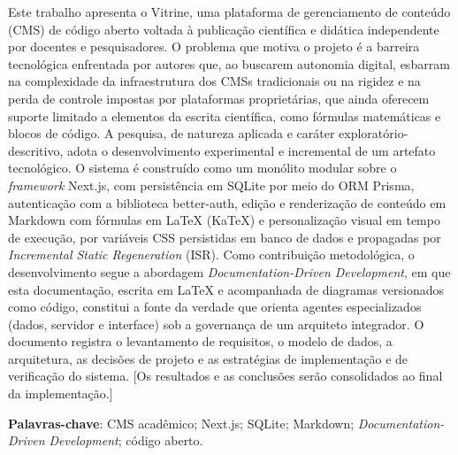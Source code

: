 \begin{resumo}
Este trabalho apresenta o Vitrine, uma plataforma de gerenciamento de conteúdo (CMS) de código aberto voltada à publicação científica e didática independente por docentes e pesquisadores. O problema que motiva o projeto é a barreira tecnológica enfrentada por autores que, ao buscarem autonomia digital, esbarram na complexidade da infraestrutura dos CMSs tradicionais ou na rigidez e na perda de controle impostas por plataformas proprietárias, que ainda oferecem suporte limitado a elementos da escrita científica, como fórmulas matemáticas e blocos de código. A pesquisa, de natureza aplicada e caráter exploratório-descritivo, adota o desenvolvimento experimental e incremental de um artefato tecnológico. O sistema é construído como um monólito modular sobre o \textit{framework} Next.js, com persistência em SQLite por meio do ORM Prisma, autenticação com a biblioteca better-auth, edição e renderização de conteúdo em Markdown com fórmulas em \LaTeX{} (KaTeX) e personalização visual em tempo de execução, por variáveis CSS persistidas em banco de dados e propagadas por \textit{Incremental Static Regeneration} (ISR). Como contribuição metodológica, o desenvolvimento segue a abordagem \textit{Documentation-Driven Development}, em que esta documentação, escrita em \LaTeX{} e acompanhada de diagramas versionados como código, constitui a fonte da verdade que orienta agentes especializados (dados, servidor e interface) sob a governança de um arquiteto integrador. O documento registra o levantamento de requisitos, o modelo de dados, a arquitetura, as decisões de projeto e as estratégias de implementação e de verificação do sistema. [Os resultados e as conclusões serão consolidados ao final da implementação.]

\vspace{\onelineskip}
\noindent
\textbf{Palavras-chave}: CMS acadêmico; Next.js; SQLite; Markdown; \textit{Documentation-Driven Development}; código aberto.
\end{resumo}

